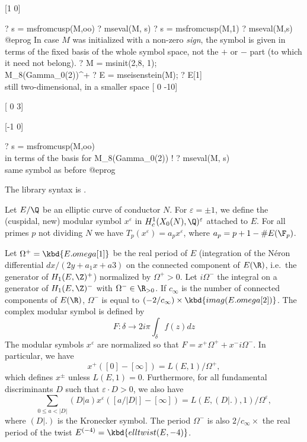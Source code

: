 [1   0]

? s = msfromcusp(M,oo)
? mseval(M, s)
? s = msfromcusp(M,1)
? mseval(M,s)
@eprog
In case $M$ was initialized with a non-zero \emph{sign}, the symbol is given
in terms of the fixed basis of the whole symbol space, not the $+$ or $-$
part (to which it need not belong).
\bprog
? M = msinit(2,8, 1);  \\  M_8(Gamma_0(2))^+
? E =  mseisenstein(M);
? E[1] \\ still two-dimensional, in a smaller space
[ 0 -10]

[ 0   3]

[-1   0]

? s = msfromcusp(M,oo) \\ in terms of the basis for M_8(Gamma_0(2)) !
? mseval(M, s) \\ same symbol as before
@eprog

The library syntax is .

\label{se:msfromell}
Let $E/\Q$ be an elliptic curve of conductor $N$. For $\varepsilon =
\pm1$, we define the (cuspidal, new) modular symbol $x^\varepsilon$ in
$H^1_c(X_0(N),\Q)^\varepsilon$  attached to
$E$. For all primes $p$ not dividing $N$ we have
$T_p(x^\varepsilon) =  a_p x^\varepsilon$, where $a_p = p+1-\#E(\F_p)$.

Let $\Omega^+ = \kbd{E.omega[1]}$ be the real period of $E$
(integration of the N\'eron differential $dx/(2y+a_1x+a3)$ on the connected
component of $E(\R)$, i.e.~the generator of $H_1(E,\Z)^+$) normalized by
$\Omega^+>0$. Let $i\Omega^-$ the integral on a generator of $H_1(E,\Z)^-$ with
$\Omega^- \in \R_{>0}$. If $c_\infty$ is the number of connected
components of $E(\R)$, $\Omega^-$ is equal to
$(-2/c_\infty) \times \kbd{imag(E.omega[2])}$.
The complex modular symbol is defined by
$$F: \delta \to  2i\pi \int_{\delta} f(z) dz$$
The modular symbols $x^\varepsilon$ are normalized so that
$ F = x^+ \Omega^+ + x^- i\Omega^-$.
In particular, we have
$$ x^+([0]-[\infty]) = L(E,1) / \Omega^+,$$
which defines $x^{\pm}$ unless $L(E,1)=0$.
Furthermore, for all fundamental discriminants $D$ such
that $\varepsilon \cdot D > 0$, we also have
$$\sum_{0\leq a<|D|} (D|a) x^\varepsilon([a/|D|]-[\infty])
   = L(E,(D|.),1) / \Omega^{\varepsilon},$$
where $(D|.)$ is the Kronecker symbol.
The period $\Omega^-$ is also $2/c_\infty \times$ the real period
of the twist $E^{(-4)} = \kbd{elltwist(E,-4)}$.

